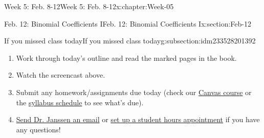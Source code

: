 \documentclass[oneside,10pt,]{book}
\numberwithin{equation}{section}
\begin{document}
\begin{chapterptx}{Week 5: Feb. 8-12}{}{Week 5: Feb. 8-12}{}{}{x:chapter:Week-05}
\begin{sectionptx}{Feb. 12: Binomial Coefficients I}{}{Feb. 12: Binomial Coefficients I}{}{}{x:section:Feb-12}
\typeout{************************************************}
%
\begin{subsectionptx}{If you missed class today}{}{If you missed class today}{}{}{g:subsection:idm233528201392}
%
\begin{enumerate}
\item{}Work through today's outline and read the marked pages in the book.%
\item{}Watch the screencast above.%
\item{}Submit any homework\slash{}assignments due today (check our \href{https://dordt.instructure.com/courses/3110050}{Canvas course} or the \href{https://prof.mkjanssen.org/ds/index.html\#schedule}{syllabus schedule} to see what's due).%
\item{}\href{mailto:mike.janssen@dordt.edu}{Send Dr. Janssen an email} or \href{https://calendly.com/mkjanssen/student-hours}{set up a student hours appointment} if you have any questions!%
\end{enumerate}
\end{subsectionptx}
\end{sectionptx}
\end{chapterptx}
%
%
\typeout{************************************************}
\typeout{************************************************}
%
\end{document}
